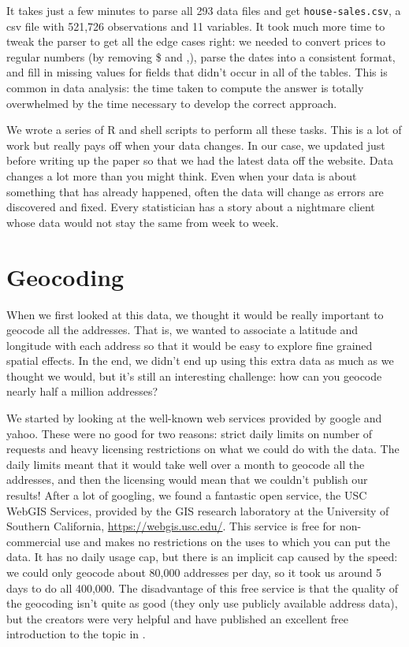 \documentclass[oneside]{article}
\begin{document}
It takes just a few minutes to parse all 293 data files and get {\tt house-sales.csv}, a csv file with 521,726 observations and 11 variables.  It took much more time to tweak the parser to get all the edge cases right: we needed to convert prices to regular numbers (by removing \$ and ,), parse the dates into a consistent format, and fill in missing values for fields that didn't occur in all of the tables.  This is common in data analysis: the time taken to compute the answer is totally overwhelmed by the time necessary to develop the correct approach.

We wrote a series of R and shell scripts to perform all these tasks. This is a lot of work but really pays off when your data changes.  In our case, we updated just before writing up the paper so that we had the latest data off the website.  Data changes a lot more than you might think.  Even when your data is about something that has already happened, often the data will change  as errors are discovered and fixed.  Every statistician has a story about a nightmare client whose data would not stay the same from week to week.

\section{Geocoding} 

When we first looked at this data, we thought it would be really important to geocode all the addresses.  That is, we wanted to associate a latitude and longitude with each address so that it would be easy to explore fine grained spatial effects.  In the end, we didn't end up using this extra data as much as we thought we would, but it's still an interesting challenge: how can you geocode nearly half a million addresses?  

We started by looking at the well-known web services provided by google and yahoo.  These were no good for two reasons: strict daily limits on number of requests and heavy licensing restrictions on what we could do with the data.  The daily limits meant that it would take well over a month to geocode all the addresses, and then the licensing would mean that we couldn't publish our results!  After a lot of googling, we found a fantastic open service, the USC WebGIS Services, provided by the GIS research laboratory at the University of Southern California, \url{https://webgis.usc.edu/}.  This service is free for non-commercial use and makes no restrictions on the uses to which you can put the data.  It has no daily usage cap, but there is an implicit cap caused by the speed: we could only geocode about 80,000 addresses per day, so it took us around 5 days to do all 400,000.  The disadvantage of this free service is that the quality of the geocoding isn't quite as good (they only use publicly available address data), but the creators were very helpful and have published an excellent free introduction to the topic in \citet{goldberg:2008}.
\end{document}
